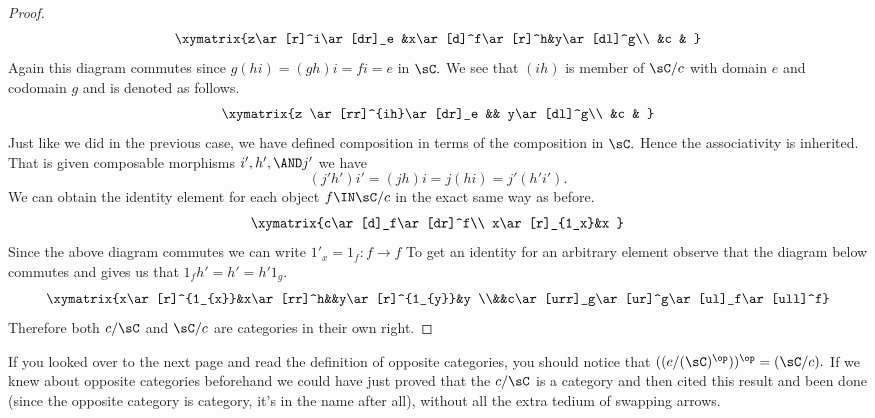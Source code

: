 \documentclass[main.tex]{subfiles}
\begin{document}
\begin{proof}
	\[\xymatrix{z\ar[r]^i\ar[dr]_e &x\ar[d]^f\ar[r]^h&y\ar[dl]^g\\ &c & }\]
	Again this diagram commutes since \(g(hi)=(gh)i=fi=e\) in \(\sC.\)
	We see that \((ih)\) is member of \(\sC/c\) with domain \(e\) and
	codomain \(g\) and is denoted as follows.
	\[\xymatrix{z \ar[rr]^{ih}\ar[dr]_e && y\ar[dl]^g\\ &c & }\]
	Just like we did in the previous case, we have defined composition in
	terms of the composition in \(\sC.\) Hence the associativity is
	inherited. That is given composable morphisms \(i',h',\AND j'\) we have
	\[(j'h')i'=(jh)i=j(hi)=j'(h'i').\]
	We can obtain the identity element for each object \(f\IN \sC/c\) in the
	exact same way as before.
	\[\xymatrix{c\ar[d]_f\ar[dr]^f\\ x\ar[r]_{1_x}&x }\]
	Since the above diagram commutes we can write \(1'_x=1_{f}:f\to f\) To
	get an identity for an arbitrary element observe that the diagram below
	commutes and gives us that \(1_{f}h'=h'=h'1_{g}\).
	\[\xymatrix{x\ar[r]^{1_{x}}&x\ar[rr]^h&&y\ar[r]^{1_{y}}&y
							 \\&&c\ar[urr]_g\ar[ur]^g\ar[ul]_f\ar[ull]^f}\]
	Therefore both \(c/\sC\) and \(\sC/c\) are categories in their own right.
\end{proof}

If you looked over to the next page and read the definition of opposite
categories, you should notice that \(((c/(\sC)^{\op}))^{\op}=(\sC/c).\)
If we knew about opposite categories beforehand we could have just
proved that the \(c/\sC\) is a category and then cited this result and
been done (since the opposite category is category, it's in the name
after all), without all the extra tedium of swapping arrows.
\end{document}
